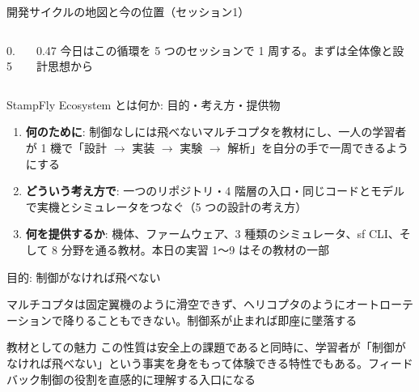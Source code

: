 
\begin{frame}{開発サイクルの地図と今の位置（セッション1）}
  \begin{columns}[c]
    \begin{column}{0.5\textwidth}
      \centering
    \end{column}
    \begin{column}{0.47\textwidth}
      \small
      今日はこの循環を 5 つのセッションで 1 周する。まずは全体像と設計思想から
    \end{column}
  \end{columns}
\end{frame}

\begin{frame}{StampFly Ecosystem とは何か: 目的・考え方・提供物}
  \begin{enumerate}
    \item \textbf{何のために}: 制御なしには飛べないマルチコプタを教材にし、一人の学習者が 1 機で「設計 $\to$ 実装 $\to$ 実験 $\to$ 解析」を自分の手で一周できるようにする
    \item \textbf{どういう考え方で}: 一つのリポジトリ・4 階層の入口・同じコードとモデルで実機とシミュレータをつなぐ（5 つの設計の考え方）
    \item \textbf{何を提供するか}: 機体、ファームウェア、3 種類のシミュレータ、sf CLI、そして 8 分野を通る教材。本日の実習 1〜9 はその教材の一部
  \end{enumerate}
\end{frame}

\begin{frame}{目的: 制御がなければ飛べない}
  \vspace{0.3em}

  \small マルチコプタは固定翼機のように滑空できず、ヘリコプタのようにオートローテーションで降りることもできない。制御系が止まれば即座に墜落する

  \vspace{0.5em}

  \begin{exampleblock}{教材としての魅力}
    \small この性質は安全上の課題であると同時に、学習者が「制御がなければ飛べない」という事実を身をもって体験できる特性でもある。フィードバック制御の役割を直感的に理解する入口になる
  \end{exampleblock}
\end{frame}

